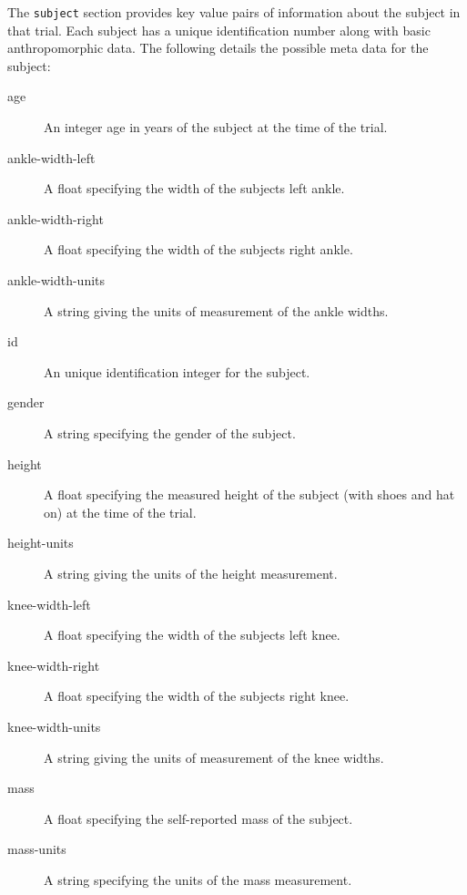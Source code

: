 \documentclass[fleqn,12pt]{wlpeerj}
\begin{document}
The \verb+subject+ section provides key value pairs of information about the
subject in that trial. Each subject has a unique identification number along
with basic anthropomorphic data. The following details the possible meta data
for the subject:
%
\begin{description}
  \item[age] An integer age in years of the subject at the time of the trial.
  \item[ankle-width-left] A float specifying the width of the subjects left
    ankle.
  \item[ankle-width-right] A float specifying the width of the subjects right
    ankle.
  \item[ankle-width-units] A string giving the units of measurement of the
    ankle widths.
  \item[id] An unique identification integer for the subject.
  \item[gender] A string specifying the gender of the subject.
  \item[height] A float specifying the measured height of the subject (with
    shoes and hat on) at the time of the trial.
  \item[height-units] A string giving the units of the height measurement.
  \item[knee-width-left] A float specifying the width of the subjects left
    knee.
  \item[knee-width-right] A float specifying the width of the subjects right
    knee.
  \item[knee-width-units] A string giving the units of measurement of the
    knee widths.
  \item[mass] A float specifying the self-reported mass of the subject.
  \item[mass-units] A string specifying the units of the mass measurement.
\end{description}
\end{document}
